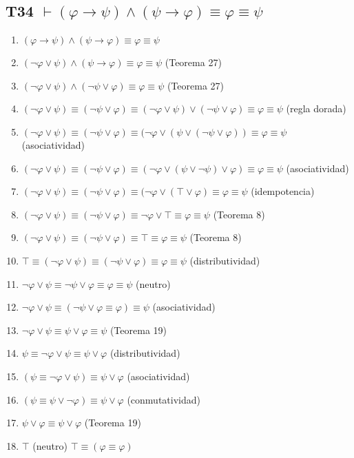 \documentclass[a4paper,11pt]{article}
\begin{document}
\subsection{T34 $\vdash (\varphi \rightarrow \psi) \land (\psi \rightarrow \varphi) \equiv \varphi \equiv \psi$}

\begin{enumerate}
    \item $(\varphi \rightarrow \psi) \land (\psi \rightarrow \varphi) \equiv \varphi \equiv \psi$
    \item $(\neg\varphi \lor \psi) \land (\psi \rightarrow \varphi) \equiv \varphi \equiv \psi$ \hfill (Teorema 27)
    \item $(\neg\varphi \lor \psi) \land (\neg\psi \lor \varphi) \equiv \varphi \equiv \psi$ \hfill (Teorema 27)
    \item $(\neg\varphi \lor \psi) \equiv (\neg\psi \lor \varphi) \equiv (\neg\varphi \lor \psi) \lor (\neg\psi \lor \varphi) \equiv \varphi \equiv \psi$ \hfill (regla dorada)
    \item $(\neg\varphi \lor \psi) \equiv (\neg\psi \lor \varphi) \equiv (\neg\varphi \lor (\psi \lor (\neg\psi \lor \varphi)) \equiv \varphi \equiv \psi$ \hfill (asociatividad)
    \item $(\neg\varphi \lor \psi) \equiv (\neg\psi \lor \varphi) \equiv (\neg\varphi \lor (\psi \lor \neg\psi) \lor \varphi) \equiv \varphi \equiv \psi$ \hfill (asociatividad)
    \item $(\neg\varphi \lor \psi) \equiv (\neg\psi \lor \varphi) \equiv (\neg\varphi \lor (\top \lor \varphi) \equiv \varphi \equiv \psi$ \hfill (idempotencia)
    \item $(\neg\varphi \lor \psi) \equiv (\neg\psi \lor \varphi) \equiv \neg\varphi \lor \top \equiv \varphi \equiv \psi$ \hfill (Teorema 8)
    \item $(\neg\varphi \lor \psi) \equiv (\neg\psi \lor \varphi) \equiv \top \equiv \varphi \equiv \psi$ \hfill (Teorema 8)
    \item $\top \equiv (\neg\varphi \lor \psi) \equiv (\neg\psi \lor \varphi) \equiv \varphi \equiv \psi$ \hfill (distributividad)
    \item $\neg\varphi \lor \psi \equiv \neg\psi \lor \varphi \equiv \varphi \equiv \psi$ \hfill (neutro)
    \item $\neg\varphi \lor \psi \equiv (\neg\psi \lor \varphi \equiv \varphi) \equiv \psi$ \hfill (asociatividad)
    \item $\neg\varphi \lor \psi \equiv \psi \lor \varphi \equiv \psi$ \hfill (Teorema 19)
    \item $\psi \equiv \neg\varphi \lor \psi \equiv \psi \lor \varphi$ \hfill (distributividad)
    \item $(\psi \equiv \neg\varphi \lor \psi) \equiv \psi \lor \varphi$ \hfill (asociatividad)
    \item $(\psi \equiv \psi \lor \neg\varphi) \equiv \psi \lor \varphi$ \hfill (conmutatividad)
    \item $\psi \lor \varphi \equiv \psi \lor \varphi$ \hfill (Teorema 19)
    \item $\top$ \hfill (neutro) $\top \equiv (\varphi \equiv \varphi)$

\end{enumerate}
\end{document}
